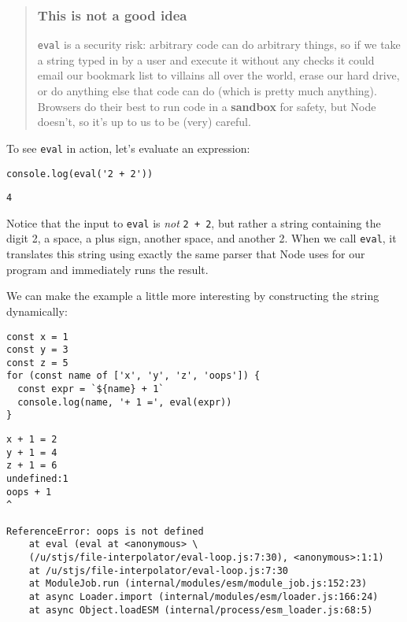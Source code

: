 \documentclass[krantzl]{krantz}
\newcommand{\glossref}[1]{\textbf{#1}}
\newenvironment{callout}{\savenotes\begin{tBox}\begin{quotation}\toggletrue{inbox}\renewcommand{\thempfootnote}{\arabic{footnote}}}{\end{quotation}\vspace{\baselineskip}\end{tBox}\togglefalse{inbox}\spewnotes}
\begin{document}
\begin{callout}


\subsubsection*{This is not a good idea}


\texttt{eval} is a security risk:
arbitrary code can do arbitrary things,
so if we take a string typed in by a user and execute it without any checks
it could email our bookmark list to villains all over the world,
erase our hard drive,
or do anything else that code can do (which is pretty much anything).
Browsers do their best to run code in a \glossref{sandbox} for safety,
but Node doesn’t,
so it’s up to us to be (very) careful.

\end{callout}


To see \texttt{eval} in action,
let’s evaluate an expression:


\begin{lstlisting}[frame=tblr]
console.log(eval('2 + 2'))
\end{lstlisting}



\begin{lstlisting}[frame=tblr,backgroundcolor=\color{black!5}]
4
\end{lstlisting}



\noindent Notice that the input to \texttt{eval} is \emph{not} \texttt{2 + 2},
but rather a string containing the digit 2,
a space,
a plus sign,
another space,
and another 2.
When we call \texttt{eval},
it translates this string
using exactly the same parser that Node uses for our program
and immediately runs the result.


We can make the example a little more interesting
by constructing the string dynamically:


\begin{lstlisting}[frame=tblr]
const x = 1
const y = 3
const z = 5
for (const name of ['x', 'y', 'z', 'oops']) {
  const expr = `${name} + 1`
  console.log(name, '+ 1 =', eval(expr))
}
\end{lstlisting}



\begin{lstlisting}[frame=tblr,backgroundcolor=\color{black!5}]
x + 1 = 2
y + 1 = 4
z + 1 = 6
undefined:1
oops + 1
^

ReferenceError: oops is not defined
    at eval (eval at <anonymous> \
    (/u/stjs/file-interpolator/eval-loop.js:7:30), <anonymous>:1:1)
    at /u/stjs/file-interpolator/eval-loop.js:7:30
    at ModuleJob.run (internal/modules/esm/module_job.js:152:23)
    at async Loader.import (internal/modules/esm/loader.js:166:24)
    at async Object.loadESM (internal/process/esm_loader.js:68:5)
\end{lstlisting}
\end{document}
